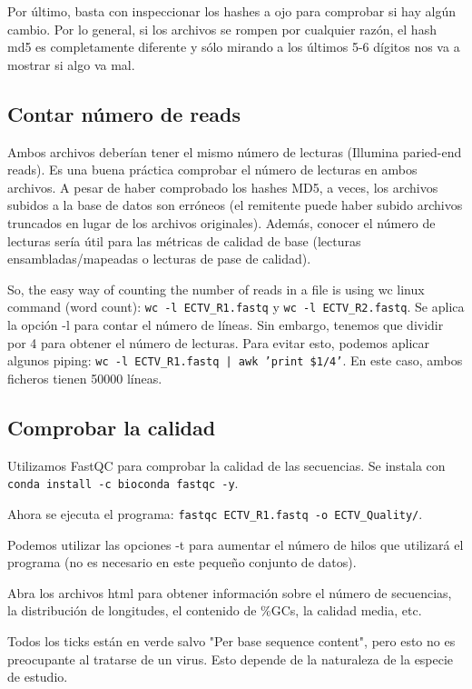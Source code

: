 Por último, basta con inspeccionar los hashes a ojo para comprobar si hay algún cambio. Por lo general, si los archivos se rompen por cualquier razón, el hash md5 es completamente diferente y sólo mirando a los últimos 5-6 dígitos nos va a mostrar si algo va mal.

\subsection{Contar número de reads}
Ambos archivos deberían tener el mismo número de lecturas (Illumina paried-end reads). Es una buena práctica comprobar el número de lecturas en ambos archivos. A pesar de haber comprobado los hashes MD5, a veces, los archivos subidos a la base de datos son erróneos (el remitente puede haber subido archivos truncados en lugar de los archivos originales). Además, conocer el número de lecturas sería útil para las métricas de calidad de base (lecturas ensambladas/mapeadas o lecturas de pase de calidad).

So, the easy way of counting the number of reads in a file is using wc linux command (word count): \texttt{wc -l ECTV\_R1.fastq} y \texttt{wc -l ECTV\_R2.fastq}. Se aplica la opción -l para contar el número de líneas. Sin embargo, tenemos que dividir por 4 para obtener el número de lecturas. Para evitar esto, podemos aplicar algunos piping:
\texttt{wc -l ECTV\_R1.fastq | awk '{print \$1/4}'}. En este caso, ambos ficheros tienen 50000 líneas.

\subsection{Comprobar la calidad}
Utilizamos FastQC para comprobar la calidad de las secuencias. Se instala con \texttt{conda install -c bioconda fastqc -y}.

Ahora se ejecuta el programa: \texttt{fastqc ECTV\_R1.fastq -o ECTV\_Quality/}.

Podemos utilizar las opciones -t para aumentar el número de hilos que utilizará el programa (no es necesario en este pequeño conjunto de datos).

Abra los archivos html para obtener información sobre el número de secuencias, la distribución de longitudes, el contenido de \%GCs, la calidad media, etc.

Todos los ticks están en verde salvo "Per base sequence content", pero esto no es preocupante al tratarse de un virus. Esto depende de la naturaleza de la especie de estudio. 